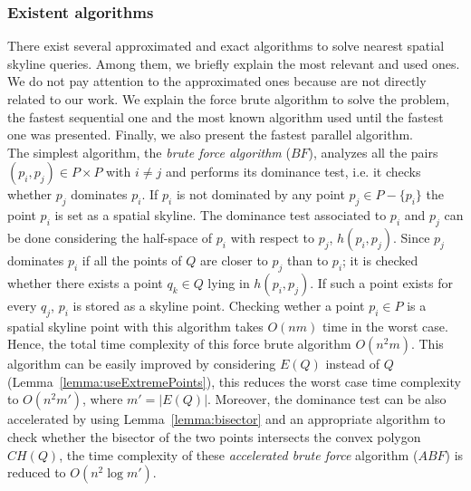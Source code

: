 \documentclass[11pt,onecolumn]{elsart3p}
\begin{document}
\subsubsection{Existent algorithms}

There exist several approximated and exact algorithms to solve nearest spatial skyline queries. Among them, we briefly explain the most relevant and used ones. We do not pay attention to the approximated ones because are not directly related to our work. We explain the force brute algorithm to solve the problem, the fastest sequential one and the most known algorithm used until the fastest one was presented. Finally, we also present the fastest parallel algorithm.\\


 The simplest algorithm, the {\it brute force algorithm} ($BF$), analyzes all the pairs $(p_i, p_j) \in  P \times P$ with $i\neq j$ and performs its dominance test, i.e. it checks whether $p_j$ dominates $p_i$. If $p_i$ is not dominated by any point $p_j\in P-\{p_i\}$ the point $p_i$ is set as a spatial skyline. The dominance test associated to $p_i$ and $p_j$ can be done considering the half-space of $p_i$ with respect to $p_j$,  $h(p_i, p_j)$. Since $p_j$ dominates $p_i$ if all the points of $Q$ are closer to $p_j$ than to $p_i$; it is checked whether there exists a point $q_k \in Q$ lying in $h(p_i, p_j)$. If such a point exists for every $q_j$, $p_i$ is stored as a skyline point. Checking wether a point $p_i\in P$ is a spatial skyline point with this algorithm takes $O(nm)$ time in the worst case. Hence, the total time complexity of this force brute algorithm $O(n^2m)$. This algorithm can be easily improved by considering $E(Q)$ instead of $Q$ (Lemma~\ref{lemma:useExtremePoints}), this reduces the worst case time complexity to $O(n^2 m')$, where $m'=|E(Q)|$. Moreover, the dominance test can be also accelerated by using Lemma~\ref{lemma:bisector} and an appropriate algorithm to check whether the bisector of the two points intersects the convex polygon $CH(Q)$, the time complexity of these {\it accelerated brute force} algorithm ($ABF$) is reduced to $O(n^2 \log m')$.\\

\end{document}
